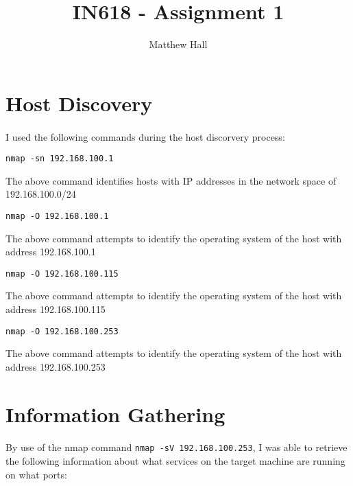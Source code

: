 \documentclass{article}
\title{IN618 - Assignment 1}
\author{Matthew Hall}
\date{}
\begin{document}
\maketitle
\newpage
{}

\tableofcontents
\newpage

\section{Host Discovery}
\paragraph{}
I used the following commands during the host discorvery process:

\texttt{nmap -sn 192.168.100.1}

The above command identifies hosts with IP addresses in the network space of 192.168.100.0/24

\texttt{nmap -O 192.168.100.1}

The above command attempts to identify the operating system of the host with address 192.168.100.1

\texttt{nmap -O 192.168.100.115}

The above command attempts to identify the operating system of the host with address 192.168.100.115

\texttt{nmap -O 192.168.100.253}

The above command attempts to identify the operating system of the host with address 192.168.100.253

\newpage

\section{Information Gathering}
\paragraph{}
By use of the nmap command \texttt{nmap -sV 192.168.100.253}, I was able to retrieve the following information about what services on the target machine are running on what ports:
\newline
\newline
\end{document}
